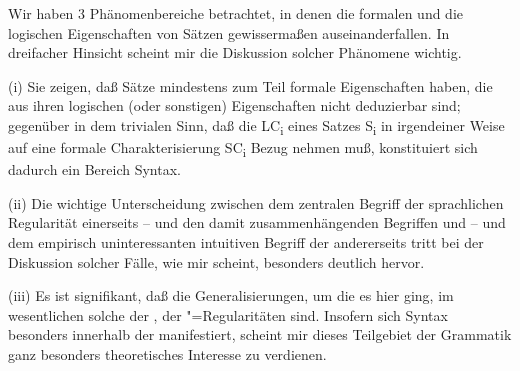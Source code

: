 \documentclass[output=paper]{langsci/langscibook}
\begin{document}
Wir haben 3 Phänomenbereiche betrachtet, in denen die formalen und die logischen Eigenschaften von Sätzen gewissermaßen auseinanderfallen. In dreifacher Hinsicht scheint mir die Diskussion solcher Phänomene wichtig.

(i) Sie zeigen, daß Sätze mindestens zum Teil formale Eigenschaften haben, die aus ihren logischen (oder sonstigen) Eigenschaften nicht deduzierbar sind; gegenüber  in dem trivialen Sinn, daß die LC\textsubscript{i} eines Satzes S\textsubscript{i} in irgendeiner Weise auf eine formale Charakterisierung SC\textsubscript{i} Bezug nehmen muß, konstituiert sich dadurch ein Bereich  Syntax.

(ii) Die wichtige Unterscheidung zwischen dem zentralen Begriff der sprachlichen
Regularität einerseits -- und den damit zusammenhängenden Begriffen  und  -- und dem empirisch uninteressanten intuitiven Begriff der  andererseits tritt bei der Diskussion solcher Fälle,
wie mir scheint, besonders deutlich hervor.

(iii) Es ist signifikant, daß die Generalisierungen, um die es hier ging, im wesentlichen solche der , \dash der "=Regularitäten sind. Insofern sich  Syntax besonders innerhalb der  manifestiert, scheint\label{page-besonderes-theoretisches-interesse} mir dieses Teilgebiet der Grammatik ganz besonders theoretisches Interesse zu verdienen.
%
\sloppy
\printbibliography[heading=subbibliography,notkeyword=this]
\label{chap-empirische-generalisierungen-end}
\end{document}

